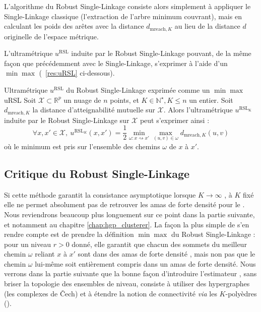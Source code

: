 L'algorithme du {Robust Single-Linkage} consiste alors simplement à appliquer le Single-Linkage classique (l'extraction de l'arbre minimum couvrant), mais en calculant les poids des arêtes avec la distance $d_{\mathrm{mreach}, K}$ au lieu de la distance $d$ originelle de l'espace métrique. 

L'ultramétrique $u^{\mathrm{RSL}}$ induite par le Robust Single-Linkage pouvant, de la même façon que précédemment avec le Single-Linkage, s'exprimer à l'aide d'un $\min \max$ \cite{Draganov2025} (\Res~\ref{res:uRSL} ci-dessous).

\begin{Resultat}{Ultramétrique $u^{\mathrm{RSL}}$ du Robust Single-Linkage exprimée comme un $\min \max$ \cite{Draganov2025}}{uRSL}
Soit $\mathcal X \subset \mathbb R^p$ un nuage de $n$ points, et $K \in \mathbb N^\star, K\le n$ un entier. Soit $d_{\mathrm{mreach}, K}$ la distance d'atteignabilité mutuelle sur $\mathcal X$. Alors l'ultramétrique $u^{\mathrm{RSL_K}}$ induite par le Robust Single-Linkage sur $\mathcal X$ peut s'exprimer ainsi :
\[
\boxed{
    \forall x,x' \in \mathcal X, \ u^{\mathrm{RSL}_K}(x,x') = \frac{1}{2} \min_{\omega : x \rightsquigarrow x'} \max_{(u, v) \in \omega} d_{\mathrm{mreach}, K}(u,v)
    }
    \]
où le minimum est pris sur l'ensemble des chemins $\omega$ de $x$ à $x'$.
\end{Resultat}



\subsection{Critique du Robust Single-Linkage} 
Si cette méthode garantit la consistance asymptotique lorsque $K \to \infty$ \cite{RobustSingleLinkage2010}, à $K$ fixé elle ne permet absolument pas de retrouver les amas de forte densité pour le \KNN.
Nous reviendrons beaucoup plus longuement sur ce point dans la partie suivante, et notamment au chapitre \ref{chap:hgp_clusterer}. La façon la plus simple de s'en rendre compte est de prendre la définition $\min \max$ du Robust Single-Linkage : pour un niveau $r>0$ donné, elle garantit que chacun des sommets du meilleur chemin $\omega$ reliant $x$ à $x'$ sont dans des amas de forte densité \KNN, mais non pas que le chemin $\omega$ lui-même soit entièrement compris dans un amas de forte densité.
Nous verrons dans la partie suivante que la bonne façon d'introduire l'estimateur \KNN, sans briser la topologie des ensembles de niveau, consiste à utiliser des hypergraphes (les complexes de \v{C}ech) et à étendre la notion de connectivité \emph{via} les $K$-polyèdres ().





